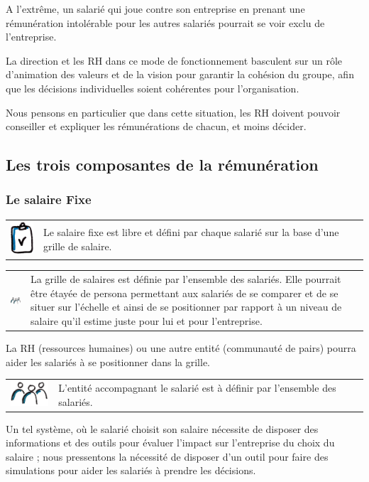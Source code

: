 \documentclass[12pt]{article}
\newcommand{\assemblee}[1]{%
  \begin{tcolorbox}[colframe=DarkPlum,boxrule=2pt,arc=4pt,left=6pt,right=6pt,top=6pt,bottom=6pt,boxsep=0pt,colback=Aluminium1]
    \begin{tabular}{m{1.5cm} m{11cm}}
      \includegraphics[width=1.5cm]{includes/team} & #1 \\
    \end{tabular}
  \end{tcolorbox}
}
\newcommand{\regle}[1]{%
  \begin{tcolorbox}[colframe=DarkOrange,boxrule=2pt,arc=4pt,left=6pt,right=6pt,top=6pt,bottom=6pt,boxsep=0pt,colback=Aluminium1]
    \begin{tabular}{m{1.0cm} m{11.5cm}}
      \includegraphics[width=1.0cm]{includes/rules} & #1 \\
    \end{tabular}
  \end{tcolorbox}
}
\begin{document}
 A l'extrême, un salarié qui joue contre son entreprise en prenant une rémunération intolérable pour les autres salariés pourrait se voir exclu de l’entreprise. 

 La direction et les RH dans ce mode de fonctionnement basculent sur un rôle d’animation des valeurs et de la vision pour garantir la cohésion du groupe, afin que les décisions individuelles soient cohérentes pour l’organisation. 
 
 Nous pensons en particulier que dans cette situation, les RH doivent pouvoir conseiller et expliquer les rémunérations de chacun, et moins décider.

\subsection{Les trois composantes de la rémunération}
\subsubsection{Le salaire Fixe}

 \regle{Le salaire fixe est libre et défini par chaque salarié sur la base d’une grille de salaire. }

 \assemblee{La grille de salaires est définie par l’ensemble des salariés. Elle pourrait être étayée de persona permettant aux salariés de se comparer et de se situer sur l’échelle et ainsi de se positionner par rapport à un niveau de salaire qu’il estime juste pour lui et pour l’entreprise.}

 La RH (ressources humaines) ou une autre entité (communauté de pairs) pourra aider les salariés à se positionner dans la grille. 
 
 \assemblee{L'entité accompagnant le salarié est à définir par l'ensemble des salariés.}
 
 Un tel système, où le salarié choisit son salaire nécessite de disposer des informations et des outils pour évaluer l’impact sur l’entreprise du choix du salaire ; nous pressentons la nécessité de disposer d’un outil pour faire des simulations pour aider les salariés à prendre les décisions.
 
\end{document}
